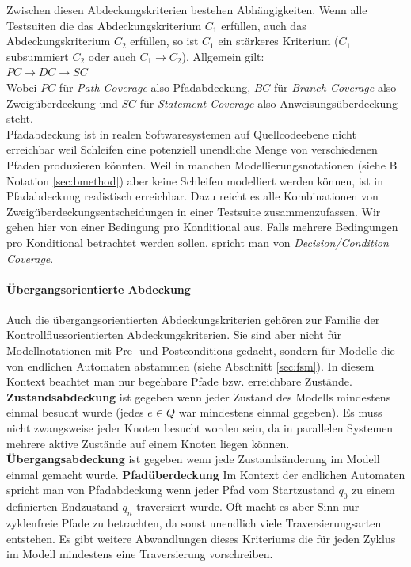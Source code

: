 Zwischen diesen Abdeckungskriterien bestehen Abhängigkeiten. Wenn alle Testsuiten die das Abdeckungskriterium $C_1$ erfüllen, auch das Abdeckungskriterium $C_2$ erfüllen, so ist $C_1$ ein stärkeres Kriterium ($C_1$ subsummiert $C_2$ oder auch $C_1 \longrightarrow C_2$). Allgemein gilt:\\
$ PC \longrightarrow DC \longrightarrow SC $\\
Wobei $PC$ für \textit{Path Coverage} also Pfadabdeckung, $BC$ für \textit{Branch Coverage} also Zweigüberdeckung und $SC$ für \textit{Statement Coverage} also Anweisungsüberdeckung steht.\\
Pfadabdeckung ist in realen Softwaresystemen auf Quellcodeebene nicht erreichbar\cite{utting_practical_2007} weil Schleifen eine potenziell unendliche Menge von verschiedenen Pfaden produzieren könnten. Weil in manchen Modellierungsnotationen (siehe B Notation \ref{sec:bmethod}) aber keine Schleifen modelliert werden können, ist in Pfadabdeckung realistisch erreichbar. Dazu reicht es alle Kombinationen von Zweigüberdeckungsentscheidungen in einer Testsuite zusammenzufassen. Wir gehen hier von einer Bedingung pro Konditional aus. Falls mehrere Bedingungen pro Konditional betrachtet werden sollen, spricht man von \textit{Decision/Condition Coverage}.

\paragraph{Übergangsorientierte Abdeckung}\label{coverage_transition}
Auch die übergangsorientierten Abdeckungskriterien gehören zur Familie der Kontrollflussorientierten Abdeckungskriterien. Sie sind aber nicht für Modellnotationen mit Pre- und Postconditions gedacht, sondern für Modelle die von endlichen Automaten abstammen (siehe Abschnitt \ref{sec:fsm}). In diesem Kontext beachtet man nur begehbare Pfade bzw. erreichbare Zustände.\\

\textbf{Zustandsabdeckung} ist gegeben wenn jeder Zustand des Modells mindestens einmal besucht wurde (jedes $e \in Q$ war mindestens einmal gegeben). Es muss nicht zwangsweise jeder Knoten besucht worden sein, da in parallelen Systemen mehrere aktive Zustände auf einem Knoten liegen können.
\textbf{Übergangsabdeckung} ist gegeben wenn jede Zustandsänderung im Modell einmal gemacht wurde.
\textbf{Pfadüberdeckung} Im Kontext der endlichen Automaten spricht man von Pfadabdeckung wenn jeder Pfad vom Startzustand $q_0$ zu einem definierten Endzustand $q_n$ traversiert wurde. Oft macht es aber Sinn nur zyklenfreie Pfade zu betrachten, da sonst unendlich viele Traversierungsarten entstehen. Es gibt weitere Abwandlungen dieses Kriteriums die für jeden Zyklus im Modell mindestens eine Traversierung vorschreiben.


